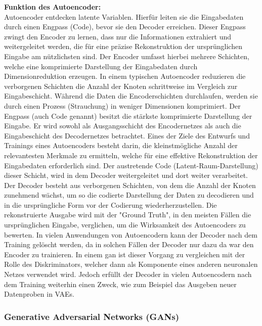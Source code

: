     \item \textbf{Funktion des Autoencoder:} \\
    Autoencoder entdecken latente Variablen. Hierfür leiten sie die Eingabedaten durch einen Engpass (Code), bevor sie den Decoder erreichen. Dieser Engpass zwingt den Encoder zu lernen, dass nur die Informationen extrahiert und weitergeleitet werden, die für eine präzise Rekonstruktion der ursprünglichen Eingabe am nützlichsten sind.\newline
    Der Encoder umfasst hierbei mehrere Schichten, welche eine komprimierte Darstellung der Eingabedaten durch Dimensionreduktion erzeugen. In einem typischen Autoencoder reduzieren die verborgenen Schichten die Anzahl der Knoten schrittweise im Vergleich zur Eingabeschicht. Während die Daten die Encoderschichten durchlaufen, werden sie durch einen Prozess (Strauchung) in weniger Dimensionen komprimiert.\newline
    Der Engpass (auch Code genannt) besitzt die stärkste komprimierte Darstellung der Eingabe. Er wird sowohl als Ausgangsschicht des Encodernetzes als auch die Eingabeschicht des Decodernetzes betrachtet. Eines der Ziele des Entwurfs und Trainings eines Autoencoders besteht darin, die kleinstmögliche Anzahl der relevantesten Merkmale zu ermitteln, welche für eine effektive Rekonstruktion der Eingabedaten erforderlich sind. Der austretende Code (Latent-Raum-Darstellung) dieser Schicht, wird in dem Decoder weitergeleitet und dort weiter verarbeitet.\newline
    Der Decoder besteht aus verborgenen Schichten, von dem die Anzahl der Knoten zunehmend wächst, um so die codierte Darstellung der Daten zu decodieren und in die ursprüngliche Form vor der Codierung wiederherzustellen. Die rekonstruierte Ausgabe wird mit der "Ground Truth", in den meisten Fällen die ursprünglichen Eingabe, verglichen, um die Wirksamkeit des Autoencoders zu bewerten.\newline
    In vielen Anwendungen von Autoencodern kann der Decoder nach dem Training gelöscht werden, da in solchen Fällen der Decoder nur dazu da war den Encoder zu trainieren. In einem \gls{gan} ist dieser Vorgang zu vergleichen mit der Rolle des Diskriminators, welcher dann als Komponente eines anderen neuronalen Netzes verwendet wird. Jedoch erfüllt der Decoder in vielen Autoencodern nach dem Training weiterhin einen Zweck, wie zum Beispiel das Ausgeben neuer Datenproben in \gls{VAE}s.\cite{ibmAutoencoder}

\subsubsection{Generative Adversarial Networks (GANs)}\label{subsubsec:gans}

